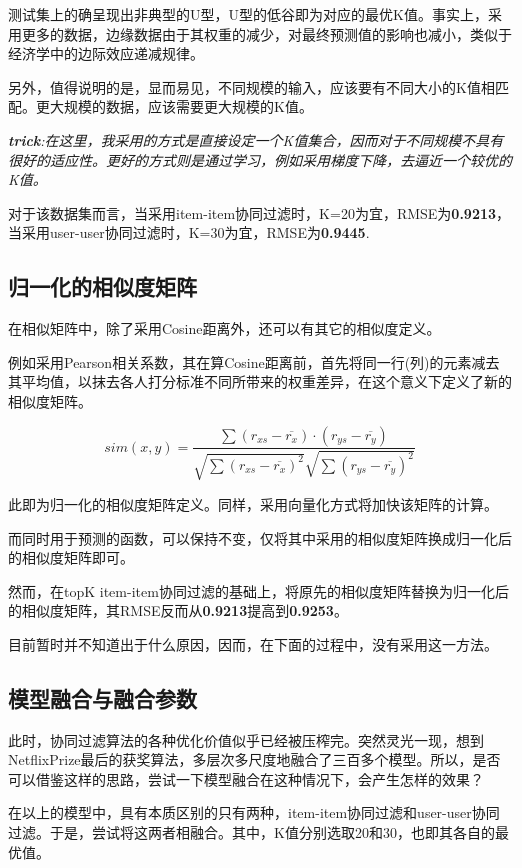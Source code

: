 \documentclass[utf8, a4paper,12pt, onecolumn]{ctexart}
\begin{document}
\begin{spacing}{1.3}
测试集上的确呈现出非典型的U型，U型的低谷即为对应的最优K值。事实上，采用更多的数据，边缘数据由于其权重的减少，对最终预测值的影响也减小，类似于经济学中的边际效应递减规律。

另外，值得说明的是，显而易见，不同规模的输入，应该要有不同大小的K值相匹配。更大规模的数据，应该需要更大规模的K值。

\textit{\textbf{trick}:在这里，我采用的方式是直接设定一个K值集合，因而对于不同规模不具有很好的适应性。更好的方式则是通过学习，例如采用梯度下降，去逼近一个较优的K值。}

对于该数据集而言，当采用item-item协同过滤时，K=20为宜，RMSE为\textbf{0.9213}，当采用user-user协同过滤时，K=30为宜，RMSE为\textbf{0.9445}.

\subsection{归一化的相似度矩阵}

在相似矩阵中，除了采用Cosine距离外，还可以有其它的相似度定义。

例如采用Pearson相关系数，其在算Cosine距离前，首先将同一行(列)的元素减去其平均值，以抹去各人打分标准不同所带来的权重差异，在这个意义下定义了新的相似度矩阵。

\[sim(x,y) = \frac{\sum (r_{xs}-\overline{r_{x}}) \cdot (r_{ys}-\overline{r_{y}})} {\sqrt{\sum (r_{xs}-\overline{r_{x}})^2} \sqrt{\sum (r_{ys}-\overline{r_{y}})^2}}\]

此即为归一化的相似度矩阵定义。同样，采用向量化方式将加快该矩阵的计算。

而同时用于预测的函数，可以保持不变，仅将其中采用的相似度矩阵换成归一化后的相似度矩阵即可。

然而，在topK item-item协同过滤的基础上，将原先的相似度矩阵替换为归一化后的相似度矩阵，其RMSE反而从\textbf{0.9213}提高到\textbf{0.9253}。

目前暂时并不知道出于什么原因，因而，在下面的过程中，没有采用这一方法。

\subsection{模型融合与融合参数}

此时，协同过滤算法的各种优化价值似乎已经被压榨完。突然灵光一现，想到NetflixPrize最后的获奖算法，多层次多尺度地融合了三百多个模型。所以，是否可以借鉴这样的思路，尝试一下模型融合在这种情况下，会产生怎样的效果？

在以上的模型中，具有本质区别的只有两种，item-item协同过滤和user-user协同过滤。于是，尝试将这两者相融合。其中，K值分别选取20和30，也即其各自的最优值。


\end{spacing}
\end{document}
